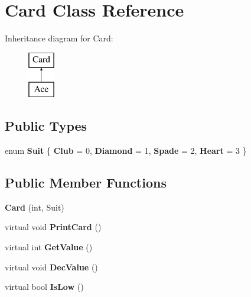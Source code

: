 \hypertarget{class_card}{}\section{Card Class Reference}
\label{class_card}
Inheritance diagram for Card\+:\begin{figure}[H]
\begin{center}
\leavevmode
\includegraphics[height=2.000000cm]{class_card}
\end{center}
\end{figure}
\subsection*{Public Types}
\begin{DoxyCompactItemize}
\item 
enum {\bfseries Suit} \{ {\bfseries Club} = 0, 
{\bfseries Diamond} = 1, 
{\bfseries Spade} = 2, 
{\bfseries Heart} = 3
 \}\hypertarget{class_card_a5725a8e05afab8cd2f555bd81b069860}{}\label{class_card_a5725a8e05afab8cd2f555bd81b069860}

\end{DoxyCompactItemize}
\subsection*{Public Member Functions}
\begin{DoxyCompactItemize}
\item 
{\bfseries Card} (int, Suit)\hypertarget{class_card_aa403413f072507d2b985ab0a89d58ec5}{}\label{class_card_aa403413f072507d2b985ab0a89d58ec5}

\item 
virtual void {\bfseries Print\+Card} ()\hypertarget{class_card_a1ff3cba078fb2e74a6754a9d6a584ee2}{}\label{class_card_a1ff3cba078fb2e74a6754a9d6a584ee2}

\item 
virtual int {\bfseries Get\+Value} ()\hypertarget{class_card_a07dbfb54476627b94d0e60c01c5f7a1e}{}\label{class_card_a07dbfb54476627b94d0e60c01c5f7a1e}

\item 
virtual void {\bfseries Dec\+Value} ()\hypertarget{class_card_a4496a1bd3aab157664d400f9fe4113e0}{}\label{class_card_a4496a1bd3aab157664d400f9fe4113e0}

\item 
virtual bool {\bfseries Is\+Low} ()\hypertarget{class_card_a04e647944979962406a30743fc727d60}{}\label{class_card_a04e647944979962406a30743fc727d60}

\end{DoxyCompactItemize}
